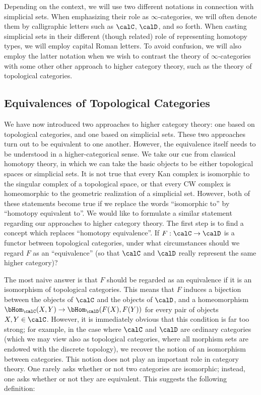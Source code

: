 \begin{notation}
Depending on the context, we will use two different notations in
connection with simplicial sets. When emphasizing their
role as $\infty$-categories, we will often denote
them by
calligraphic letters such as $\calC$, $\calD$, and so forth. When
casting simplicial sets in their different (though related) role
of representing homotopy types, we will employ capital Roman
letters. To avoid confusion, we will also employ the latter notation
when we wish to contrast the theory of $\infty$-categories with some
other other approach to higher category theory, such as the theory
of topological categories.
\end{notation}

\subsection{Equivalences of Topological Categories}\label{stronghcat}

We have now introduced two approaches to higher category theory: one based on topological categories, and one based on simplicial sets. These two approaches turn out to be equivalent to one another. However, the equivalence itself needs to be understood in a higher-categorical sense. We take our cue from classical homotopy theory, in which we can take the basic objects to be either topological spaces or simplicial sets. It is not true that every Kan complex is isomorphic to the singular complex of a topological space, or that every CW complex is homeomorphic to the geometric realization of a simplicial set. However, both of these statements become true if we replace the words ``isomorphic to'' by ``homotopy equivalent to''. We would like to formulate a similar statement regarding our approaches to higher category theory. The first step is to find a concept which replaces ``homotopy equivalence''. If $F: \calC \rightarrow \calD$ is a functor between topological categories, under what circumstances should we regard $F$ as an ``equivalence'' (so that $\calC$ and $\calD$ really represent the same higher category)? 

The most naive answer is that $F$ should be regarded as an equivalence if it is an isomorphism of topological categories. This means that $F$ induces a bijection between the objects of $\calC$ and the objects of $\calD$, and a homeomorphism $\bHom_{\calC}(X,Y) \rightarrow \bHom_{\calD}(F(X),F(Y))$ for every pair of objects $X,Y \in \calC$. However, it is immediately obvious that this condition is far too strong; for example, in the case where $\calC$ and $\calD$ are ordinary categories (which we may view also as topological categories, where all morphism sets are endowed with the discrete topology), we recover the notion of an isomorphism between categories. This notion does not play an important role in category theory. One rarely asks whether or not two categories are isomorphic; instead, one asks whether or not they are equivalent. This suggests the following definition:

